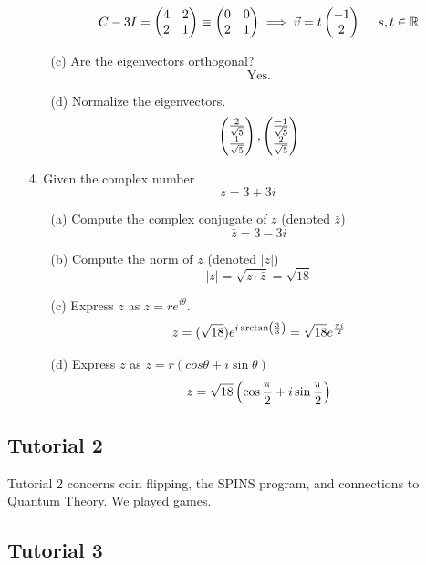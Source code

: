 \documentclass[english, 11pt]{article}
\begin{document}
\begin{itemize}
\begin{itemize}
           \[ C - 3I = \left(\begin{matrix}4 & 2 \\ 2 & 1 \end{matrix}\right) \equiv \left(\begin{matrix}0 & 0 \\ 2 & 1\end{matrix}\right) \implies {\vec{v}} = t\left(\begin{matrix}-1 \\ 2\end{matrix}\right) \ \ \ \ s, t \in {\mathbb{R}}\]
         \item[(c)] Are the eigenvectors orthogonal?
         \[ \mbox{Yes.} \]
         \item[(d)] Normalize the eigenvectors.
         \[ \left(\begin{matrix}\frac{2}{\sqrt{5}} \\ \frac{1}{\sqrt{5}}\end{matrix}\right), \left(\begin{matrix}\frac{-1}{\sqrt{5}} \\ \frac{2}{\sqrt{5}}\end{matrix}\right) \]
       \end{itemize}
       \item[4.] Given the complex number
       \[ z = 3 + 3i \]
       \begin{itemize}
         \item[(a)] Compute the complex conjugate of $z$ (denoted $\bar{z}$)
            \[ \bar{z} = 3 - 3i \]
         \item[(b)] Compute the norm of $z$ (denoted $|z|$)
            \[ |z| = \sqrt{z\cdot \bar{z}} = \sqrt{18} \]
         \item[(c)] Express $z$ as $z = re^{i\theta}$.
            \[ z = (\sqrt{18})e^{i\arctan\left( \frac{3}{3} \right)} = \sqrt{18}e^{\frac{\pi i}{2}} \]
         \item[(d)] Express $z$ as $z = r(cos\theta + i\sin\theta)$
             \[ z = \sqrt{18}\left(\cos \frac{\pi}{2} + i\sin \frac{\pi}{2}\right) \]
       \end{itemize}
     \end{itemize}

     \subsection{Tutorial 2}

      Tutorial 2 concerns coin flipping, the SPINS program, and connections to Quantum Theory. We played games.

     \subsection{Tutorial 3}
\end{document}
